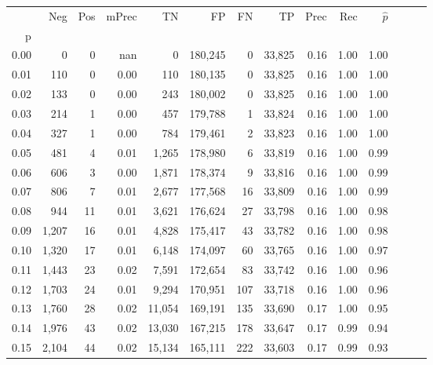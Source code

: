 \begin{tabular}{rrrrrrrrrrrrrr}
\toprule
{} &    Neg &  Pos & mPrec &       TN &       FP &      FN &      TP &  Prec &   Rec & $\hat{p}$ \\
p    &        &      &       &          &          &         &         &       &       &           \\
\midrule
0.00 &      0 &    0 &   nan &        0 &  180,245 &       0 &  33,825 &  0.16 &  1.00 &      1.00 \\
0.01 &    110 &    0 &  0.00 &      110 &  180,135 &       0 &  33,825 &  0.16 &  1.00 &      1.00 \\
0.02 &    133 &    0 &  0.00 &      243 &  180,002 &       0 &  33,825 &  0.16 &  1.00 &      1.00 \\
0.03 &    214 &    1 &  0.00 &      457 &  179,788 &       1 &  33,824 &  0.16 &  1.00 &      1.00 \\
0.04 &    327 &    1 &  0.00 &      784 &  179,461 &       2 &  33,823 &  0.16 &  1.00 &      1.00 \\
0.05 &    481 &    4 &  0.01 &    1,265 &  178,980 &       6 &  33,819 &  0.16 &  1.00 &      0.99 \\
0.06 &    606 &    3 &  0.00 &    1,871 &  178,374 &       9 &  33,816 &  0.16 &  1.00 &      0.99 \\
0.07 &    806 &    7 &  0.01 &    2,677 &  177,568 &      16 &  33,809 &  0.16 &  1.00 &      0.99 \\
0.08 &    944 &   11 &  0.01 &    3,621 &  176,624 &      27 &  33,798 &  0.16 &  1.00 &      0.98 \\
0.09 &  1,207 &   16 &  0.01 &    4,828 &  175,417 &      43 &  33,782 &  0.16 &  1.00 &      0.98 \\
0.10 &  1,320 &   17 &  0.01 &    6,148 &  174,097 &      60 &  33,765 &  0.16 &  1.00 &      0.97 \\
0.11 &  1,443 &   23 &  0.02 &    7,591 &  172,654 &      83 &  33,742 &  0.16 &  1.00 &      0.96 \\
0.12 &  1,703 &   24 &  0.01 &    9,294 &  170,951 &     107 &  33,718 &  0.16 &  1.00 &      0.96 \\
0.13 &  1,760 &   28 &  0.02 &   11,054 &  169,191 &     135 &  33,690 &  0.17 &  1.00 &      0.95 \\
0.14 &  1,976 &   43 &  0.02 &   13,030 &  167,215 &     178 &  33,647 &  0.17 &  0.99 &      0.94 \\
0.15 &  2,104 &   44 &  0.02 &   15,134 &  165,111 &     222 &  33,603 &  0.17 &  0.99 &      0.93 \\

\end{tabular}

